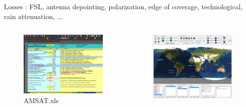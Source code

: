 \documentclass[11pt]{beamer}
\begin{document}
\begin{frame}
	Losses : FSL, antenna depointing, polarization, edge of coverage, technological, rain attenuation, ... %
	\pause
	\begin{columns}[onlytextwidth]
		\begin{column}{.32\textwidth}
			\begin{figure}
				\includegraphics[width=\textwidth]{AMSAT.png}
				\caption{AMSAT.xls}
			\end{figure}
		\end{column}
		\hfill
		\begin{column}{.32\textwidth}
			\begin{figure}
				\includegraphics[width=\textwidth]{satorb.png}

\end{figure}
\end{column}
\end{columns}
\end{frame}
\end{document}
